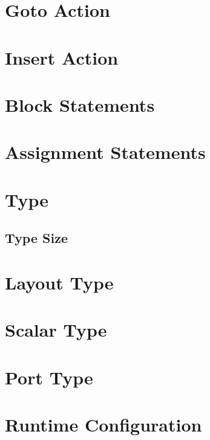 \section{Goto Action} \label{goto_guide}

\section{Insert Action} \label{insert_guide}

\section{Block Statements} \label{block_stmt_guide}

\section{Assignment Statements} \label{assign_stmt_guide}

\section{Type} \label{type_guide}

\subsection{Type Size} \label{type_size}

\section{Layout Type} \label{layout_type_guide}

\section{Scalar Type} \label{scalar_type_guide}

\section{Port Type} \label{port_type}

\section{Runtime Configuration} \label{config_guide}
